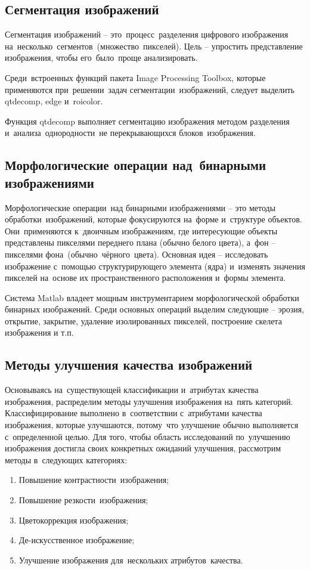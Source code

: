\documentclass{ou}
\begin{document}
\subsection{Сегментация изображений}
Сегментация изображений -- это~процесс~разделения цифрового изображения на~несколько~сегментов~(множество~пикселей). Цель -- упростить представление изображения, чтобы его~было~проще анализировать. 

Среди~встроенных функций пакета Image Processing Toolbox, которые применяются при~решении~задач сегментации~изображений, следует выделить qtdecomp, edge и~roicolor.

Функция qtdecomp выполняет сегментацию изображения методом разделения и~анализа~однородности~не перекрывающихся блоков~изображения.
\subsection{Морфологические операции над~бинарными изображениями}
Морфологические операции~над бинарными изображениями -- это методы обработки~изображений, которые фокусируются на~форме и~структуре объектов. Они~применяются к~двоичным изображениям, где интересующие объекты представлены пикселями переднего плана (обычно белого цвета), а~фон -- пикселями фона~(обычно~чёрного~цвета). Основная идея -- исследовать изображение с~помощью структурирующего элемента (ядра) и~изменять значения пикселей на~основе их пространственного расположения и~формы элемента.

Система Matlab владеет мощным инструментарием морфологической обработки бинарных изображений. Среди основных операций выделим следующие -- эрозия, открытие, закрытие, удаление изолированных пикселей, построение скелета изображения и т.п.
\subsection{Методы улучшения качества изображений}
Основываясь на~существующей классификации и~атрибутах качества изображения, распределим методы улучшения изображения на~пять категорий. Классифицирование выполнено в~соответствии с~атрибутами качества изображения, которые улучшаются, потому~что улучшение обычно выполняется с~определенной целью. Для того, чтобы область исследований по~улучшению изображения достигла своих конкретных ожиданий улучшения, рассмотрим методы в~следующих категориях:
\begin{enumerate}[itemindent=2em, nosep, label=\arabic*)]
\item Повышение контрастности~изображения;
\item Повышение резкости~изображения;
\item Цветокоррекция изображения;
\item Де-искусственное изображение;
\item Улучшение изображения для~нескольких атрибутов~качества.
\end{enumerate}
\end{document}
